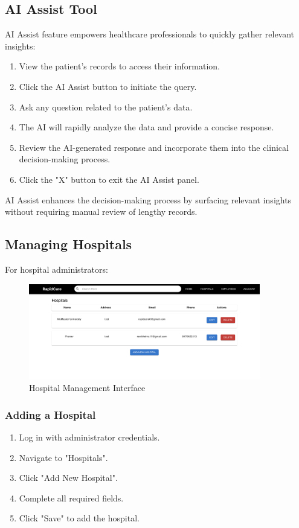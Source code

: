\documentclass[12pt, titlepage]{article}
\begin{document}
\subsection{AI Assist Tool}

AI Assist feature empowers healthcare professionals to quickly gather relevant insights:

\begin{enumerate} 
\item View the patient's records to access their information. 
\item Click the AI Assist button to initiate the query. 
\item Ask any question related to the patient's data.
\item The AI will rapidly analyze the data and provide a concise response. 
\item Review the AI-generated response and incorporate them into the clinical decision-making process. 
\item Click the "X" button to exit the AI Assist panel.
\end{enumerate}

AI Assist enhances the decision-making process by surfacing relevant insights without requiring manual review of lengthy records.


\subsection{Managing Hospitals}
For hospital administrators:

\begin{figure}[H]
\centering
\includegraphics[width=0.9\textwidth]{hospital.png}
\caption{Hospital Management Interface}
\label{fig:Hospital Management Interface}
\end{figure}

\subsubsection{Adding a Hospital}
\begin{enumerate}
\item Log in with administrator credentials.
\item Navigate to "Hospitals".
\item Click "Add New Hospital".
\item Complete all required fields.
\item Click "Save" to add the hospital.
\end{enumerate}
\end{document}
